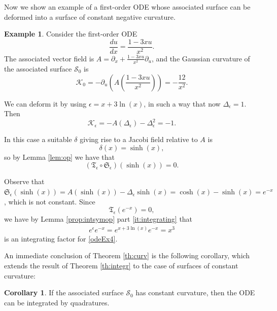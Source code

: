 \documentclass{article}
\theoremstyle{remark}
\theoremstyle{definition}
\newtheorem{corollary}[remark]{Corollary}
\newtheorem{example}[remark]{Example}
\begin{document}
Now we show an example of a first-order ODE whose associated surface can be deformed into a surface of constant negative curvature.
\begin{example}
Consider the first-order ODE
\begin{equation}\label{odeEx4}
    \dfrac{du}{dx}=\dfrac{1-3x u}{x^2}.
\end{equation}
The associated vector field is $A=\partial_x+\frac{1-3x u}{x^2} \partial_u$, and the Gaussian curvature of the associated surface $\mathcal{S}_0$ is
$$
\mathcal{K}_0=-\partial_u\left(A\left(\dfrac{1-3x u}{x^2}\right)\right)=-\dfrac{12}{x^2}.
$$

We can deform it by using $\epsilon=x+3\ln(x)$, in such a way that now $\Delta_{\epsilon}=1$. Then
$$
\mathcal{K}_{\epsilon}=-A(\Delta_{\epsilon})-\Delta_{\epsilon}^2=-1.
$$

In this case a suitable $\delta$ giving rise to a Jacobi field relative to $A$ is 
$$
\delta(x)=\sinh(x),
$$
so by Lemma \ref{lem:op} we have that
$$
\left(\mathfrak{T}_{\epsilon}\circ \mathfrak{S}_{\epsilon} \right)(\sinh(x))=0.
$$

Observe that $\mathfrak{S}_{\epsilon} (\sinh(x))=A(\sinh(x))-\Delta_{\epsilon} \sinh(x)=\cosh(x)-\sinh(x)=e^{-x}$, which is not constant. Since
$$
\mathfrak{T}_{\epsilon}(e^{-x})=0,
$$
we have by Lemma \ref{prop:intsymop} part \ref{it:integrating} that
$$
\begin{aligned}
e^{\epsilon} e^{-x}=e^{x+3\ln(x)}e^{-x}=x^3
\end{aligned}
$$
is an integrating factor for \eqref{odeEx4}.


\end{example}


An immediate conclusion of Theorem \ref{th:curv} is the following corollary, which extends the result of Theorem \ref{th:integr} to the case of surfaces of constant curvature:

\begin{corollary}\label{cor:constant}
If the associated surface $\mathcal{S}_0$ has constant curvature, then the ODE can be integrated by quadratures.
\end{corollary}
\end{document}
